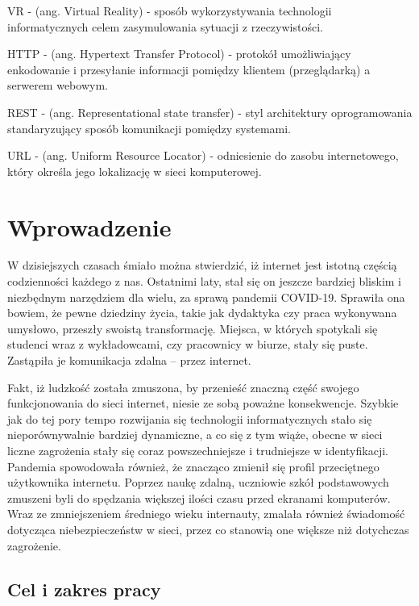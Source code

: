 \documentclass[12pt,twoside]{article}
\begin{document}
VR - (ang. Virtual Reality) - sposób wykorzystywania technologii informatycznych celem zasymulowania sytuacji z rzeczywistości.

HTTP - (ang. Hypertext Transfer Protocol) - protokół umożliwiający enkodowanie i przesyłanie informacji pomiędzy klientem (przeglądarką) a serwerem webowym.

REST - (ang. Representational state transfer) - styl architektury oprogramowania standaryzujący sposób komunikacji pomiędzy systemami.

URL - (ang. Uniform Resource Locator) - odniesienie do zasobu internetowego, który określa jego lokalizację w sieci komputerowej.

\clearpage
\section{Wprowadzenie}

W dzisiejszych czasach śmiało można stwierdzić, iż	internet jest istotną częścią codzienności każdego z nas. Ostatnimi laty, stał się on jeszcze bardziej bliskim i niezbędnym narzędziem dla wielu, za sprawą pandemii COVID-19. Sprawiła ona bowiem, że pewne dziedziny życia, takie jak dydaktyka czy praca wykonywana umysłowo, przeszły swoistą transformację. Miejsca, w których spotykali się studenci wraz z wykładowcami, czy pracownicy w biurze, stały się puste. Zastąpiła je komunikacja zdalna -- przez internet. 

Fakt, iż ludzkość została zmuszona, by przenieść znaczną część swojego funkcjonowania do sieci internet, niesie ze sobą poważne konsekwencje. Szybkie jak do tej pory tempo rozwijania się technologii informatycznych stało się nieporównywalnie bardziej dynamiczne, a co się z tym wiąże, obecne w sieci liczne zagrożenia stały się coraz powszechniejsze i trudniejsze w identyfikacji. Pandemia spowodowała również, że znacząco zmienił się profil przeciętnego użytkownika internetu. Poprzez naukę zdalną, uczniowie szkół podstawowych zmuszeni byli do spędzania większej ilości czasu przed ekranami komputerów. Wraz ze zmniejszeniem średniego wieku internauty, zmalała również świadomość dotycząca niebezpieczeństw w sieci, przez co stanowią one większe niż dotychczas zagrożenie. 

\subsection{Cel i zakres pracy}
\end{document}

